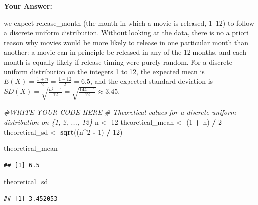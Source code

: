 \documentclass[
]{article}
\newenvironment{Shaded}{\begin{snugshade}}{\end{snugshade}}
\newcommand{\CommentTok}[1]{\textcolor[rgb]{0.56,0.35,0.01}{\textit{#1}}}
\newcommand{\DecValTok}[1]{\textcolor[rgb]{0.00,0.00,0.81}{#1}}
\newcommand{\FunctionTok}[1]{\textcolor[rgb]{0.13,0.29,0.53}{\textbf{#1}}}
\newcommand{\NormalTok}[1]{#1}
\newcommand{\OtherTok}[1]{\textcolor[rgb]{0.56,0.35,0.01}{#1}}
\newcommand{\SpecialCharTok}[1]{\textcolor[rgb]{0.81,0.36,0.00}{\textbf{#1}}}
\begin{document}
\textbf{Your Answer:}

we expect release\_month (the month in which a movie is released, 1--12)
to follow a discrete uniform distribution. Without looking at the data,
there is no a priori reason why movies would be more likely to release
in one particular month than another: a movie can in principle be
released in any of the 12 months, and each month is equally likely if
release timing were purely random. For a discrete uniform distribution
on the integers 1 to 12, the expected mean is
\(E(X) = \frac{1+n}{2} = \frac{1+12}{2} = 6.5\), and the expected
standard deviation is
\(SD(X) = \sqrt{\frac{n^2-1}{12}} = \sqrt{\frac{144-1}{12}} \approx 3.45\).

\begin{Shaded}
\begin{Highlighting}[]
\CommentTok{\#WRITE YOUR CODE HERE}
\CommentTok{\# Theoretical values for a discrete uniform distribution on \{1, 2, ..., 12\}}
\NormalTok{n }\OtherTok{\textless{}{-}} \DecValTok{12}
\NormalTok{theoretical\_mean }\OtherTok{\textless{}{-}}\NormalTok{ (}\DecValTok{1} \SpecialCharTok{+}\NormalTok{ n) }\SpecialCharTok{/} \DecValTok{2}
\NormalTok{theoretical\_sd }\OtherTok{\textless{}{-}} \FunctionTok{sqrt}\NormalTok{((n}\SpecialCharTok{\^{}}\DecValTok{2} \SpecialCharTok{{-}} \DecValTok{1}\NormalTok{) }\SpecialCharTok{/} \DecValTok{12}\NormalTok{)}

\NormalTok{theoretical\_mean}
\end{Highlighting}
\end{Shaded}

\begin{verbatim}
## [1] 6.5
\end{verbatim}

\begin{Shaded}
\begin{Highlighting}[]
\NormalTok{theoretical\_sd}
\end{Highlighting}
\end{Shaded}

\begin{verbatim}
## [1] 3.452053
\end{verbatim}

\begin{Shaded}
\end{Shaded}
\end{document}
